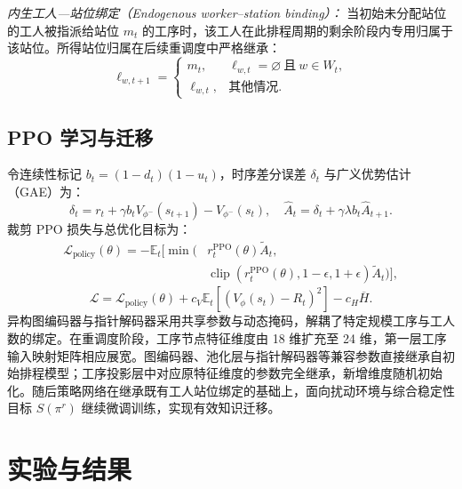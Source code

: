 \documentclass[journal,10pt]{IEEEtran}
\begin{document}
\textit{内生工人---站位绑定（Endogenous worker--station binding）：}
当初始未分配站位的工人被指派给站位 $m_t$ 的工序时，该工人在此排程周期的剩余阶段内专用归属于该站位。所得站位归属在后续重调度中严格继承：
\begin{equation}
\ell_{w,t+1} = \begin{cases} m_t, & \ell_{w,t}=\varnothing \ \text{且}\ w\in W_t, \\ \ell_{w,t}, & \text{其他情况}. \end{cases}
\end{equation}

\subsection{PPO 学习与迁移}\label{sec:learning}

令连续性标记 $b_t=(1-d_t)(1-u_t)$，时序差分误差 $\delta_t$ 与广义优势估计（GAE）\cite{schulman2016}为：
\begin{equation}
\delta_t = r_t + \gamma b_t V_{\phi^-}(s_{t+1}) - V_{\phi^-}(s_t), \quad \widehat A_t = \delta_t + \gamma\lambda b_t \widehat A_{t+1}.
\end{equation}
裁剪 PPO 损失\cite{schulman2017}与总优化目标为：
\begin{equation}
\begin{aligned}
\mathcal L_{\mathrm{policy}}(\theta) = -\mathbb E_t\Big[ \min\Big( &r_t^{\mathrm{PPO}}(\theta)\widetilde A_t, \\
&\operatorname{clip}(r_t^{\mathrm{PPO}}(\theta), 1-\epsilon, 1+\epsilon)\widetilde A_t \Big) \Big],
\end{aligned}
\end{equation}
\begin{equation}
\mathcal L = \mathcal L_{\mathrm{policy}}(\theta) + c_V \mathbb E_t[(V_\phi(s_t)-R_t)^2] - c_H \overline H.
\end{equation}
异构图编码器与指针解码器采用共享参数与动态掩码，解耦了特定规模工序与工人数的绑定。在重调度阶段，工序节点特征维度由 18 维扩充至 24 维，第一层工序输入映射矩阵相应展宽。图编码器、池化层与指针解码器等兼容参数直接继承自初始排程模型；工序投影层中对应原特征维度的参数完全继承，新增维度随机初始化。随后策略网络在继承既有工人站位绑定的基础上，面向扰动环境与综合稳定性目标 $S(\pi^r)$ 继续微调训练，实现有效知识迁移。

\section{实验与结果}\label{sec:experiments}
\end{document}

